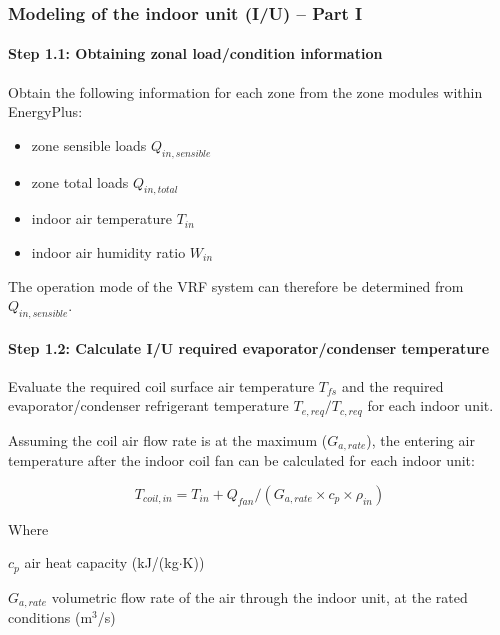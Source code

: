 \subsubsection{Modeling of the indoor unit (I/U) -- Part I}\label{modeling-of-the-indoor-unit-iu-part-i}

\paragraph{Step 1.1: Obtaining zonal load/condition information}\label{step-1.1-obtaining-zonal-load-condition-information}

Obtain the following information for each zone from the zone modules within EnergyPlus: 

\begin{itemize}
  \item
    zone sensible loads $Q_{in, sensible}$
  \item
    zone total loads $Q_{in, total}$
  \item
    indoor air temperature $T_{in}$
  \item
    indoor air humidity ratio $W_{in}$
\end{itemize}

The operation mode of the VRF system can therefore be determined from $Q_{in, sensible}$.

\paragraph{Step 1.2: Calculate I/U required evaporator/condenser temperature}\label{step-1.2-calculate-i-u-required-evaporator-condenser-temperature}

Evaluate the required coil surface air temperature $T_{fs}$ and the required evaporator/condenser refrigerant temperature $T_{e,req}/{T_{c,req}}$ for each indoor unit. 

Assuming the coil air flow rate is at the maximum ($G_{a,rate}$), the entering air temperature after the indoor coil fan can be calculated for each indoor unit:

\begin{equation}
  T_{coil,in}=T_{in}+Q_{fan}/(G_{a,rate}\times{c_p}\times\rho_{in})
\end{equation}

Where

$c_p$	air heat capacity (kJ/(kg$\cdot$K))

$G_{a,rate}$	volumetric flow rate of the air through the indoor unit, at the rated conditions (m\(^3\)/s)

